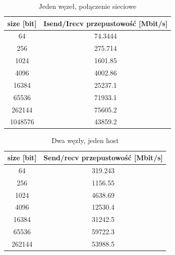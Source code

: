 \documentclass[10pt,english, openany]{book}
\begin{document}
\begin{table}[H]
\caption{Jeden węzeł, połączenie sieciowe}
\begin{center}
\begin{tabular}{|c|c|}
\hline
size {[}bit{]} & Isend/Irecv przepustowość {[}Mbit/s{]} \\ \hline
64           & 74.3444                                \\ \hline
256          & 275.714                                \\ \hline
1024         & 1601.85                                \\ \hline
4096         & 4002.86                                \\ \hline
16384        & 25237.1                                \\ \hline
65536        & 71933.1                                \\ \hline
262144       & 75605.2                                \\ \hline
1048576      & 43859.2                                \\ \hline
\end{tabular}
\end{center}
\end{table}

\begin{table}[H]
\caption{Dwa węzły, jeden host}
\begin{center}
\begin{tabular}{|c|c|}
\hline
size {[}bit{]} & Send/recv przepustowość {[}Mbit/s{]} \\ \hline
64           & 319.243                              \\ \hline
256          & 1156.55                              \\ \hline
1024         & 4638.69                              \\ \hline
4096         & 12530.4                              \\ \hline
16384        & 31242.5                              \\ \hline
65536        & 59722.3                              \\ \hline
262144       & 53988.5                              \\ \hline
\end{tabular}
\end{center}
\end{table}
\end{document}
